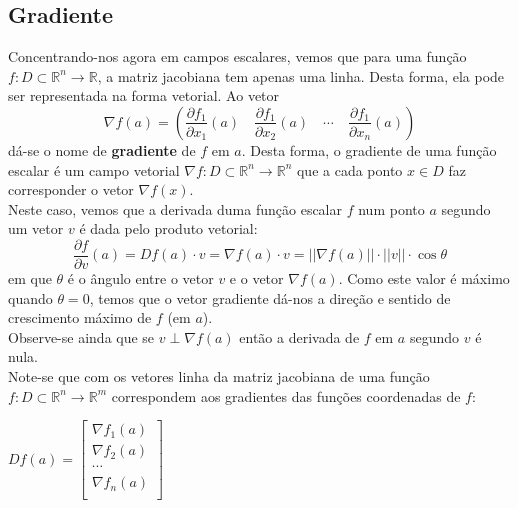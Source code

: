 \documentclass{article}
\newcommand{\R}{\mathbb{R}}
\begin{document}
\subsection{Gradiente}
Concentrando-nos agora em campos escalares, vemos que para uma função $f: D \subset \R^n \to \R$, a matriz jacobiana tem apenas uma linha. Desta forma, ela pode ser representada na forma vetorial. Ao vetor
$$
\nabla f(a) = \left( \frac{\partial f_1}{\partial x_1}(a) \quad \frac{\partial f_1}{\partial x_2}(a) \quad \cdots \quad \frac{\partial f_1}{\partial x_n}(a) \right)
$$
dá-se o nome de \textbf{gradiente} de $f$ em $a$. Desta forma, o gradiente de uma função escalar é um campo vetorial $\nabla f: D \subset \R^n \to \R^n$ que a cada ponto $x \in D$ faz corresponder o vetor $\nabla f(x)$.\\
Neste caso, vemos que a derivada duma função escalar $f$ num ponto $a$ segundo um vetor $v$ é dada pelo produto vetorial:
$$
\frac{\partial f}{\partial v}(a) = Df(a) \cdot v = \nabla f(a) \cdot v = || \nabla f(a) || \cdot ||v|| \cdot \cos \theta
$$
em que $\theta$ é o ângulo entre o vetor $v$ e o vetor $\nabla f(a)$. Como este valor é máximo quando $\theta = 0$, temos que o vetor gradiente dá-nos a direção e sentido de crescimento máximo de $f$ (em $a$).\\
Observe-se ainda que se $v \perp \nabla f(a)$ então a derivada de $f$ em $a$ segundo $v$ é nula.\\
Note-se que com os vetores linha da matriz jacobiana de uma função $f: D \subset \R^n \to \R^m$ correspondem aos gradientes das funções coordenadas de $f$:
\begin{center}$
\renewcommand*{\arraystretch}{1.2}
Df(a) =
\begin{bmatrix}
\nabla f_1(a) \\
\nabla f_2(a) \\
\cdots \\
\nabla f_n(a) \\
\end{bmatrix}$
\end{center}
\end{document}
